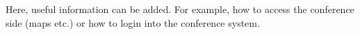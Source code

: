 Here, useful information can be added. For example, how to access the conference
side (maps etc.) or how to login into the conference system.

